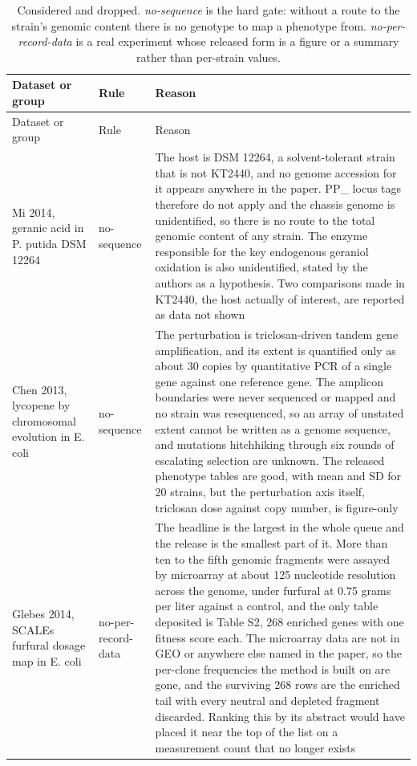 \begingroup
\footnotesize
\begin{longtable}{@{}L{58mm} L{28mm} L{83mm}@{}}
\caption[]{Considered and dropped. \emph{no-sequence} is the hard gate: without a route
to the strain's genomic content there is no genotype to map a phenotype from.
\emph{no-per-record-data} is a real experiment whose released form is a figure or a
summary rather than per-strain values.}
\label{tab:bexcluded}\\
\toprule
Dataset or group & Rule & Reason \\
\midrule
\endfirsthead
\toprule
Dataset or group & Rule & Reason \\
\midrule
\endhead
\bottomrule
\endfoot
Mi 2014, geranic acid in P. putida DSM 12264 & no-sequence & The host is DSM 12264, a solvent-tolerant strain that is not KT2440, and no genome accession for it appears anywhere in the paper. PP\_ locus tags therefore do not apply and the chassis genome is unidentified, so there is no route to the total genomic content of any strain. The enzyme responsible for the key endogenous geraniol oxidation is also unidentified, stated by the authors as a hypothesis. Two comparisons made in KT2440, the host actually of interest, are reported as data not shown \\
\addlinespace[5pt]
Chen 2013, lycopene by chromosomal evolution in E. coli & no-sequence & The perturbation is triclosan-driven tandem gene amplification, and its extent is quantified only as about 30 copies by quantitative PCR of a single gene against one reference gene. The amplicon boundaries were never sequenced or mapped and no strain was resequenced, so an array of unstated extent cannot be written as a genome sequence, and mutations hitchhiking through six rounds of escalating selection are unknown. The released phenotype tables are good, with mean and SD for 20 strains, but the perturbation axis itself, triclosan dose against copy number, is figure-only \\
\addlinespace[5pt]
Glebes 2014, SCALEs furfural dosage map in E. coli & no-per-record-data & The headline is the largest in the whole queue and the release is the smallest part of it. More than ten to the fifth genomic fragments were assayed by microarray at about 125 nucleotide resolution across the genome, under furfural at 0.75 grams per liter against a control, and the only table deposited is Table S2, 268 enriched genes with one fitness score each. The microarray data are not in GEO or anywhere else named in the paper, so the per-clone frequencies the method is built on are gone, and the surviving 268 rows are the enriched tail with every neutral and depleted fragment discarded. Ranking this by its abstract would have placed it near the top of the list on a measurement count that no longer exists \\

\end{longtable}
